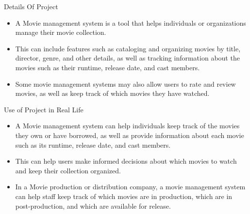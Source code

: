 \documentclass{beamer}
\begin{document}
\begin{frame}{Details Of Project}
    \begin{itemize}
        \item  A  Movie management system is a tool that helps individuals or organizations manage their movie collection. 
                  \vspace{0.5cm}
        \item This can include features such as cataloging and organizing movies by title, director, genre, and other details, as well as tracking information about the movies such as their runtime, release date, and cast members.
                  \vspace{0.5cm}
        \item  Some movie management systems may also allow users to rate and review movies, as well as keep track of which movies they have watched.
    \end{itemize}
\end{frame}

\begin{frame}{Use of Project in Real Life}
    \begin{itemize}
        \item A  Movie management system can help individuals keep track of the movies they own or have borrowed, as well as provide information about each movie such as its runtime, release date, and cast members. 
          \vspace{0.5cm}
        \item This can help users make informed decisions about which movies to watch and keep their collection organized.
          \vspace{0.5cm}
        \item In a Movie production or distribution company, a movie management system can help staff keep track of which movies are in production, which are in post-production, and which are available for release. 
    \end{itemize}
\end{frame}
\end{document}
